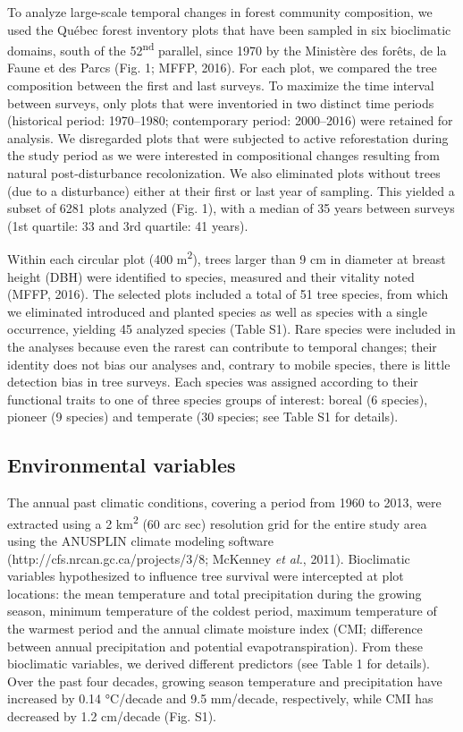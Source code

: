 \documentclass[a4paperpaper,]{article}
\begin{document}
To analyze large-scale temporal changes in forest community composition,
we used the Québec forest inventory plots that have been sampled in six
bioclimatic domains, south of the 52\textsuperscript{nd} parallel, since
1970 by the Ministère des forêts, de la Faune et des Parcs (Fig. 1;
MFFP, 2016). For each plot, we compared the tree composition between the
first and last surveys. To maximize the time interval between surveys,
only plots that were inventoried in two distinct time periods
(historical period: 1970--1980; contemporary period: 2000--2016) were
retained for analysis. We disregarded plots that were subjected to
active reforestation during the study period as we were interested in
compositional changes resulting from natural post-disturbance
recolonization. We also eliminated plots without trees (due to a
disturbance) either at their first or last year of sampling. This
yielded a subset of 6281 plots analyzed (Fig. 1), with a median of 35
years between surveys (1st quartile: 33 and 3rd quartile: 41 years).

Within each circular plot (400 m\textsuperscript{2}), trees larger than
9 cm in diameter at breast height (DBH) were identified to species,
measured and their vitality noted (MFFP, 2016). The selected plots
included a total of 51 tree species, from which we eliminated introduced
and planted species as well as species with a single occurrence,
yielding 45 analyzed species (Table S1). Rare species were included in
the analyses because even the rarest can contribute to temporal changes;
their identity does not bias our analyses and, contrary to mobile
species, there is little detection bias in tree surveys. Each species
was assigned according to their functional traits to one of three
species groups of interest: boreal (6 species), pioneer (9 species) and
temperate (30 species; see Table S1 for details).

\hypertarget{environmental-variables}{%
\subsection{Environmental variables}\label{environmental-variables}}

The annual past climatic conditions, covering a period from 1960 to
2013, were extracted using a 2 km\textsuperscript{2} (60 arc sec)
resolution grid for the entire study area using the ANUSPLIN climate
modeling software (http://cfs.nrcan.gc.ca/projects/3/8; McKenney
\emph{et al.}, 2011). Bioclimatic variables hypothesized to influence
tree survival were intercepted at plot locations: the mean temperature
and total precipitation during the growing season, minimum temperature
of the coldest period, maximum temperature of the warmest period and the
annual climate moisture index (CMI; difference between annual
precipitation and potential evapotranspiration). From these bioclimatic
variables, we derived different predictors (see Table 1 for details).
Over the past four decades, growing season temperature and precipitation
have increased by 0.14 °C/decade and 9.5 mm/decade, respectively, while
CMI has decreased by 1.2 cm/decade (Fig. S1).
\end{document}
